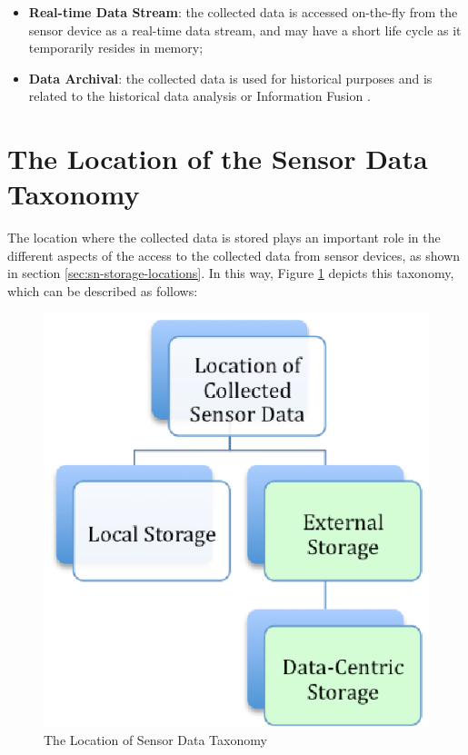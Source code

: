 \begin{itemize}
  \item \textbf{Real-time Data Stream}: the collected data is accessed
  on-the-fly from the sensor device as a real-time data stream, and may have a
  short life cycle as it temporarily resides in memory;
  \item \textbf{Data Archival}: the collected data is used for historical
  purposes and is related to the historical data analysis \cite{sn-intro01,
  sn-intro02} or Information Fusion \cite{sn-info-fusion}. 
\end{itemize}

\section{The Location of the Sensor Data Taxonomy}

The location where the collected data is stored plays an important role
in the different aspects of the access to the collected data from sensor
devices, as shown in section \ref{sec:sn-storage-locations}. In this way,
Figure \ref{fig:taxonomy-data-location} depicts this taxonomy, which can be
described as follows:

\begin{figure}[h]
  \centering
  \includegraphics{../diagrams/taxonomy-data-location}
  \caption{The Location of Sensor Data Taxonomy}
  \label{fig:taxonomy-data-location}
\end{figure}

